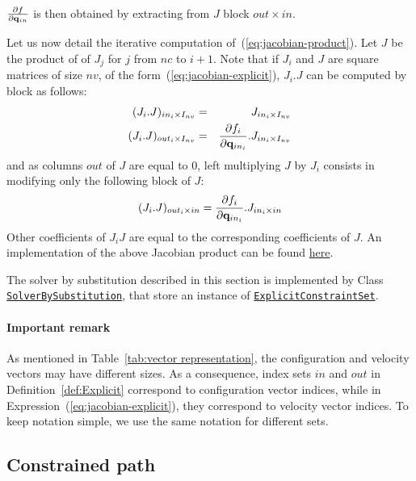 $\frac{\partial f}{\partial\mathbf{q}_{in}}$ is then obtained by extracting from $J$ block $out\times in$.

Let us now detail the iterative computation of~(\ref{eq:jacobian-product}). Let $J$ be the product of of $J_j$ for $j$ from $nc$ to $i+1$.
Note that if $J_i$ and $J$ are square matrices of size $nv$, of the form~(\ref{eq:jacobian-explicit}), $J_i.J$ can be computed by block as follows:
\begin{eqnarray*}
  (J_{i}.J)_{in_{i}\times I_{nv}} &=& J_{in_{i}\times I_{nv}}\\
  (J_{i}.J)_{out_{i}\times I_{nv}} &=& \frac{\partial f_i}{\partial\mathbf{q}_{in_{i}}}.J_{in_{i}\times I_{nv}}\\
\end{eqnarray*}
and as columns $out$ of $J$ are equal to $0$, left multiplying $J$ by $J_i$ consists in modifying only the following block of $J$:
$$
  (J_{i}.J)_{out_{i}\times in} = \frac{\partial f_i}{\partial\mathbf{q}_{in_{i}}}.J_{in_{i}\times {in}}\\
$$
Other coefficients of $J_{i}J$ are equal to the corresponding coefficients of $J$.
An implementation of the above Jacobian product can be found \href{https://github.com/humanoid-path-planner/hpp-constraints/blob/e21490c8c713949bd3038dccb6fe02cf254a615f/src/explicit-constraint-set.cc#L267}{here}.

The solver by substitution described in this section is implemented by Class \href{https://gepettoweb.laas.fr/hpp/hpp-constraints/doxygen-html/classhpp_1_1constraints_1_1solver_1_1BySubstitution.html}{\texttt{SolverBySubstitution}}, that store an instance of \href{https://gepettoweb.laas.fr/hpp/hpp-constraints/doxygen-html/classhpp_1_1constraints_1_1ExplicitConstraintSet.html}{\texttt{ExplicitConstraintSet}}.

\paragraph{Important remark} As mentioned in Table~\ref{tab:vector representation}, the configuration and velocity vectors may have different sizes. As a consequence, index sets $in$ and $out$ in Definition~\ref{def:Explicit} correspond to configuration vector indices, while in Expression~(\ref{eq:jacobian-explicit}), they correspond to velocity vector indices. To keep notation simple, we use the same notation for different sets.

\subsection{Constrained path}

